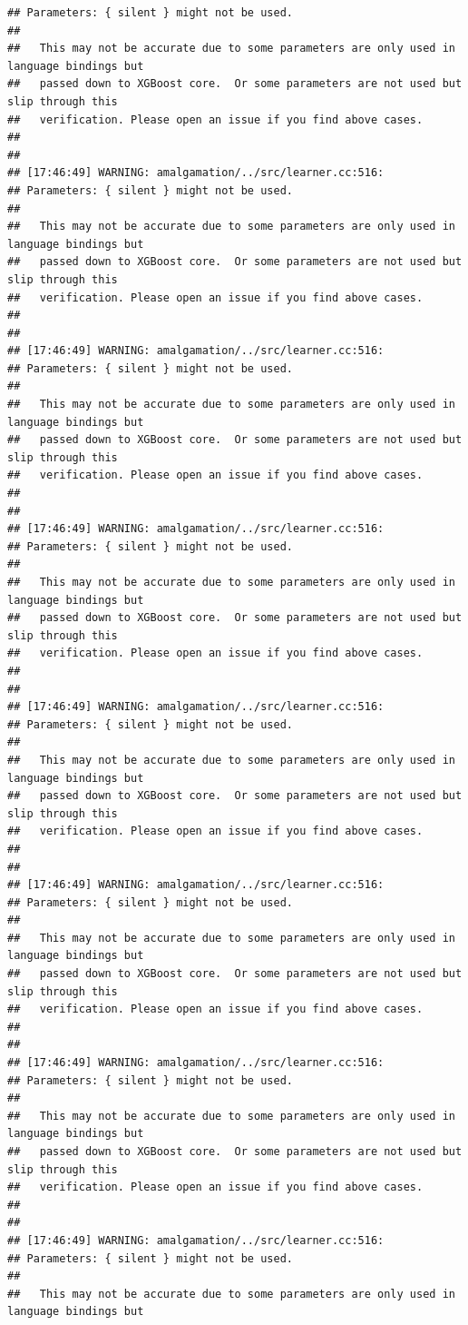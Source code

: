 \documentclass[AMS,STIX2COL]{WileyNJD-v2}\usepackage[]{graphicx}\usepackage[]{color}
\makeatletter
\newenvironment{kframe}{%
 \def\at@end@of@kframe{}%
 \ifinner\ifhmode%
  \def\at@end@of@kframe{\end{minipage}}%
  \begin{minipage}{\columnwidth}%
 \fi\fi%
 \def\FrameCommand##1{\hskip\@totalleftmargin \hskip-\fboxsep
 \colorbox{shadecolor}{##1}\hskip-\fboxsep
     \hskip-\linewidth \hskip-\@totalleftmargin \hskip\columnwidth}%
 \MakeFramed {\advance\hsize-\width
   \@totalleftmargin\z@ \linewidth\hsize
   \@setminipage}}%
 {\par\unskip\endMakeFramed%
 \at@end@of@kframe}
\newenvironment{knitrout}{}{} %
\makeatother
\begin{document}
\begin{knitrout}
\begin{kframe}
\begin{verbatim}
## Parameters: { silent } might not be used.
## 
##   This may not be accurate due to some parameters are only used in language bindings but
##   passed down to XGBoost core.  Or some parameters are not used but slip through this
##   verification. Please open an issue if you find above cases.
## 
## 
## [17:46:49] WARNING: amalgamation/../src/learner.cc:516: 
## Parameters: { silent } might not be used.
## 
##   This may not be accurate due to some parameters are only used in language bindings but
##   passed down to XGBoost core.  Or some parameters are not used but slip through this
##   verification. Please open an issue if you find above cases.
## 
## 
## [17:46:49] WARNING: amalgamation/../src/learner.cc:516: 
## Parameters: { silent } might not be used.
## 
##   This may not be accurate due to some parameters are only used in language bindings but
##   passed down to XGBoost core.  Or some parameters are not used but slip through this
##   verification. Please open an issue if you find above cases.
## 
## 
## [17:46:49] WARNING: amalgamation/../src/learner.cc:516: 
## Parameters: { silent } might not be used.
## 
##   This may not be accurate due to some parameters are only used in language bindings but
##   passed down to XGBoost core.  Or some parameters are not used but slip through this
##   verification. Please open an issue if you find above cases.
## 
## 
## [17:46:49] WARNING: amalgamation/../src/learner.cc:516: 
## Parameters: { silent } might not be used.
## 
##   This may not be accurate due to some parameters are only used in language bindings but
##   passed down to XGBoost core.  Or some parameters are not used but slip through this
##   verification. Please open an issue if you find above cases.
## 
## 
## [17:46:49] WARNING: amalgamation/../src/learner.cc:516: 
## Parameters: { silent } might not be used.
## 
##   This may not be accurate due to some parameters are only used in language bindings but
##   passed down to XGBoost core.  Or some parameters are not used but slip through this
##   verification. Please open an issue if you find above cases.
## 
## 
## [17:46:49] WARNING: amalgamation/../src/learner.cc:516: 
## Parameters: { silent } might not be used.
## 
##   This may not be accurate due to some parameters are only used in language bindings but
##   passed down to XGBoost core.  Or some parameters are not used but slip through this
##   verification. Please open an issue if you find above cases.
## 
## 
## [17:46:49] WARNING: amalgamation/../src/learner.cc:516: 
## Parameters: { silent } might not be used.
## 
##   This may not be accurate due to some parameters are only used in language bindings but

\end{verbatim}
\end{kframe}
\end{knitrout}
\end{document}
